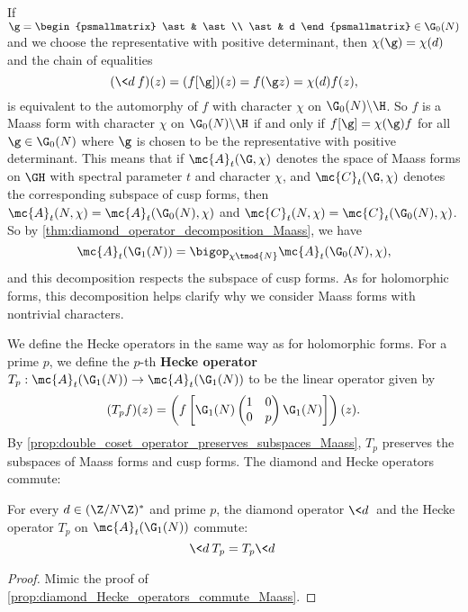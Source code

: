     If $\g = \begin{psmallmatrix} \ast & \ast \\ \ast & d \end{psmallmatrix} \in \G_{0}(N)$ and we choose the representative with positive determinant, then $\chi(\g) = \chi(d)$ and the chain of equalities
    \[
      (\<d\>f)(z) = (f[\g])(z) = f(\g z) = \chi(d)f(z),
    \]
    is equivalent to the automorphy of $f$ with character $\chi$ on $\G_{0}(N)\backslash\H$. So $f$ is a Maass form with character $\chi$ on $\G_{0}(N)\backslash\H$ if and only if $f[\g] = \chi(\g)f$ for all $\g \in \G_{0}(N)$ where $\g$ is chosen to be the representative with positive determinant. This means that if $\mc{A}_{t}(\G,\chi)$ denotes the space of Maass forms on $\GH$ with spectral parameter $t$ and character $\chi$, and $\mc{C}_{t}(\G,\chi)$ denotes the corresponding subspace of cusp forms, then $\mc{A}_{t}(N,\chi) = \mc{A}_{t}(\G_{0}(N),\chi)$ and $\mc{C}_{t}(N,\chi) = \mc{C}_{t}(\G_{0}(N),\chi)$. So by \cref{thm:diamond_operator_decomposition_Maass}, we have
    \[
      \mc{A}_{t}(\G_{1}(N)) = \bigop_{\chi \tmod{N}}\mc{A}_{t}(\G_{0}(N),\chi),
    \]
    and this decomposition respects the subspace of cusp forms. As for holomorphic forms, this decomposition helps clarify why we consider Maass forms with nontrivial characters.
    
    We define the Hecke operators in the same way as for holomorphic forms. For a prime $p$, we define the $p$-th \textbf{Hecke operator} $T_{p}:\mc{A}_{t}(\G_{1}(N)) \to \mc{A}_{t}(\G_{1}(N))$ to be the linear operator given by
    \[
      (T_{p}f)(z) = \left(f\left[\G_{1}(N)\begin{pmatrix} 1 & 0 \\ 0 & p \end{pmatrix}\G_{1}(N)\right]\right)(z).
    \]
    By \cref{prop:double_coset_operator_preserves_subspaces_Maass}, $T_{p}$ preserves the subspaces of Maass forms and cusp forms. The diamond and Hecke operators commute:

    \begin{proposition}\label{prop:diamond_Hecke_operators_commute_Maass}
      For every $d \in (\Z/N\Z)^{\ast}$ and prime $p$, the diamond operator $\<d\>$ and the Hecke operator $T_{p}$ on $\mc{A}_{t}(\G_{1}(N))$ commute:
      \[
        \<d\>T_{p} = T_{p}\<d\>
      \]
    \end{proposition}
    \begin{proof}
      Mimic the proof of \cref{prop:diamond_Hecke_operators_commute_Maass}.
    \end{proof}


